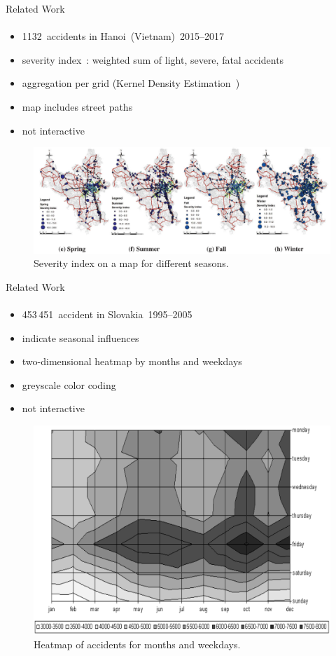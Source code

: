 \documentclass[english]{mlutalk}
\begin{document}
\begin{frame}{Related Work}
  \framesubtitle{\textcite{LeLL2020}}
  \begin{itemize}
    \item 1132~accidents in Hanoi~(Vietnam)~2015--2017
    \item severity index~\cite{GeurtsWBV2004}: weighted sum of light, severe, fatal accidents
    \item aggregation per grid (Kernel Density Estimation~\cite{Anderson2009})
    \item map includes street paths
    \item not interactive
  \end{itemize}
  \begin{figure}
    \centering
    \includegraphics[width=0.8\linewidth]{figures/le2020}
    \caption{Severity index on a map for different seasons.~\cite{LeLL2020}}
  \end{figure}
\end{frame}

\begin{frame}{Related Work}
  \framesubtitle{\textcite{LavravcJTK2008}}
  \begin{itemize}
    \item 453\,451~accident in Slovakia~1995--2005
    \item indicate seasonal influences
    \item two-dimensional heatmap by months and weekdays
    \item greyscale color coding
    \item not interactive
  \end{itemize}
  \begin{figure}
    \centering
    \includegraphics[width=0.4\linewidth]{figures/lavrac2008}
    \caption{Heatmap of accidents for months and weekdays.~\cite{LavravcJTK2008}}
  \end{figure}
\end{frame}
\end{document}
